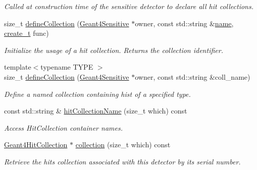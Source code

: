 \begin{DoxyCompactItemize}
\begin{DoxyCompactList}\small\item\em Called at construction time of the sensitive detector to declare all hit collections. \end{DoxyCompactList}\item 
size\+\_\+t \hyperlink{class_d_d4hep_1_1_simulation_1_1_geant4_sens_det_action_sequence_af610d10bd4b9a699b7d8b4179b0de946}{define\+Collection} (\hyperlink{class_d_d4hep_1_1_simulation_1_1_geant4_sensitive}{Geant4\+Sensitive} $\ast$owner, const std\+::string \&\hyperlink{class_d_d4hep_1_1_simulation_1_1_geant4_action_af374e70b014d16afb81dd9d77cc3894b}{name}, \hyperlink{class_d_d4hep_1_1_simulation_1_1_geant4_sens_det_action_sequence_a449bfc3938d1e870ce8af2e80c16f25f}{create\+\_\+t} func)
\begin{DoxyCompactList}\small\item\em Initialize the usage of a hit collection. Returns the collection identifier. \end{DoxyCompactList}\item 
{\footnotesize template$<$typename T\+Y\+PE $>$ }\\size\+\_\+t \hyperlink{class_d_d4hep_1_1_simulation_1_1_geant4_sens_det_action_sequence_a63d81e779d97e7426d0a0fc036bc6dbf}{define\+Collection} (\hyperlink{class_d_d4hep_1_1_simulation_1_1_geant4_sensitive}{Geant4\+Sensitive} $\ast$owner, const std\+::string \&coll\+\_\+name)
\begin{DoxyCompactList}\small\item\em Define a named collection containing hist of a specified type. \end{DoxyCompactList}\item 
const std\+::string \& \hyperlink{class_d_d4hep_1_1_simulation_1_1_geant4_sens_det_action_sequence_adf93b5f5979f9d289aa09f0909a5bd7d}{hit\+Collection\+Name} (size\+\_\+t which) const
\begin{DoxyCompactList}\small\item\em Access Hit\+Collection container names. \end{DoxyCompactList}\item 
\hyperlink{class_d_d4hep_1_1_simulation_1_1_geant4_hit_collection}{Geant4\+Hit\+Collection} $\ast$ \hyperlink{class_d_d4hep_1_1_simulation_1_1_geant4_sens_det_action_sequence_ae8f783b4958cb90097b5735e5351591e}{collection} (size\+\_\+t which) const
\begin{DoxyCompactList}\small\item\em Retrieve the hits collection associated with this detector by its serial number. \end{DoxyCompactList}\item 

\end{DoxyCompactItemize}
